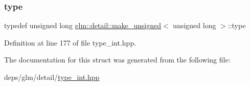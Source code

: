 \subsubsection{\texorpdfstring{type}{type}}
{\footnotesize\ttfamily typedef unsigned long \hyperlink{structglm_1_1detail_1_1make__unsigned}{glm\+::detail\+::make\+\_\+unsigned}$<$ unsigned long $>$\+::type}



Definition at line 177 of file type\+\_\+int.\+hpp.



The documentation for this struct was generated from the following file\+:\begin{DoxyCompactItemize}
\item 
deps/glm/detail/\hyperlink{type__int_8hpp}{type\+\_\+int.\+hpp}\end{DoxyCompactItemize}
